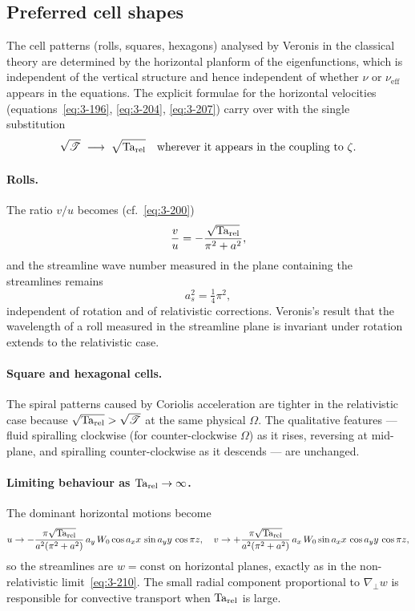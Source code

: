 \subsection*{Preferred cell shapes}

The cell patterns (rolls, squares, hexagons) analysed by Veronis in the
classical theory are determined by the horizontal planform of the
eigenfunctions, which is independent of the vertical structure and hence
independent of whether $\nu$ or $\nu_{\mathrm{eff}}$ appears in the
equations.  The explicit formulae for the horizontal velocities
(equations~\eqref{eq:3-196}, \eqref{eq:3-204}, \eqref{eq:3-207}) carry
over with the single substitution
\begin{equation}\label{eq:rel-T-sub}
  \sqrt{\mathscr{T}} \;\longrightarrow\; \sqrt{\mathrm{Ta}_{\mathrm{rel}}}
  \quad\text{wherever it appears in the coupling to }\zeta.
\end{equation}

\paragraph{Rolls.}
The ratio $v/u$ becomes (cf.~\eqref{eq:3-200})
\begin{equation}\label{eq:rel-3-200}
  \frac{v}{u}
  = -\frac{\sqrt{\mathrm{Ta}_{\mathrm{rel}}}}{\pi^2 + a^2},
\end{equation}
and the streamline wave number measured in the plane containing
the streamlines remains
\begin{equation}\label{eq:rel-3-203}
  a_s^2 = \tfrac14\pi^2,
\end{equation}
independent of rotation and of relativistic corrections.  Veronis's
result that the wavelength of a roll measured in the streamline plane is
invariant under rotation extends to the relativistic case.

\paragraph{Square and hexagonal cells.}
The spiral patterns caused by Coriolis acceleration are tighter in the
relativistic case because $\sqrt{\mathrm{Ta}_{\mathrm{rel}}} > \sqrt{\mathscr{T}}$ at the
same physical $\Omega$.  The qualitative features --- fluid spiralling
clockwise (for counter-clockwise $\Omega$) as it rises, reversing at
mid-plane, and spiralling counter-clockwise as it descends --- are
unchanged.

\paragraph{Limiting behaviour as $\mathrm{Ta}_{\mathrm{rel}} \to \infty$.}
The dominant horizontal motions become
\begin{equation}\label{eq:rel-3-208}
  u \to -\frac{\pi\sqrt{\mathrm{Ta}_{\mathrm{rel}}}}{a^2(\pi^2+a^2)}\,a_y\,W_0
        \cos a_x x\,\sin a_y y\,\cos\pi z,
  \quad
  v \to +\frac{\pi\sqrt{\mathrm{Ta}_{\mathrm{rel}}}}{a^2(\pi^2+a^2)}\,a_x\,W_0
        \sin a_x x\,\cos a_y y\,\cos\pi z,
\end{equation}
so the streamlines are $w = \mathrm{const}$ on horizontal planes,
exactly as in the non-relativistic limit~\eqref{eq:3-210}.  The small
radial component proportional to $\nabla_\perp w$ is responsible for
convective transport when $\mathrm{Ta}_{\mathrm{rel}}$ is large.

